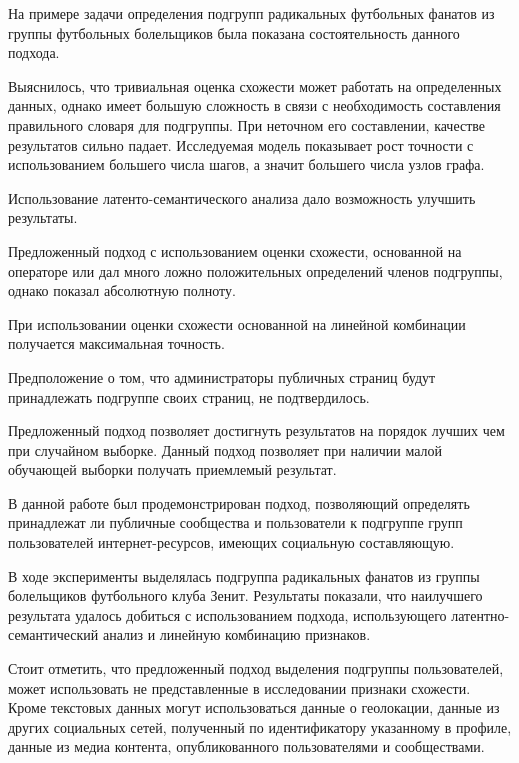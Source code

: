 \documentclass[annotation,times,page4]{itmo-student-thesis}
\begin{document}
На примере задачи определения подгрупп радикальных футбольных фанатов из группы футбольных болельщиков была показана состоятельность данного подхода. 

Выяснилось, что тривиальная оценка схожести может работать на определенных данных, однако имеет большую сложность в связи с необходимость составления правильного словаря для подгруппы. При неточном его составлении, качестве результатов сильно падает. Исследуемая модель показывает рост точности с использованием большего числа шагов, а значит большего числа узлов графа. 

Использование латенто-семантического анализа дало возможность улучшить результаты.

Предложенный подход с использованием оценки схожести, основанной на операторе или дал много ложно положительных определений членов подгруппы, однако показал абсолютную полноту.

При использовании оценки схожести основанной на линейной комбинации получается максимальная точность.

Предположение о том, что администраторы публичных страниц будут принадлежать подгруппе своих страниц, не подтвердилось. 

Предложенный подход позволяет достигнуть результатов на порядок лучших чем при случайном выборке.  
 Данный подход позволяет при наличии малой обучающей выборки получать приемлемый результат.



\startconclusionpage

В данной работе был продемонстрирован подход, позволяющий определять принадлежат ли публичные сообщества и пользователи к подгруппе групп пользователей интернет-ресурсов, имеющих социальную составляющую.

В ходе эксперименты выделялась подгруппа радикальных фанатов из группы болельщиков футбольного клуба Зенит. Результаты показали, что наилучшего результата удалось добиться с использованием подхода, использующего латентно-семантический анализ и линейную комбинацию признаков.

Стоит отметить, что предложенный подход выделения подгруппы пользователей, может использовать не представленные в исследовании признаки схожести. Кроме текстовых данных могут использоваться данные о геолокации, данные из других социальных сетей, полученный по идентификатору указанному в профиле, данные из медиа контента, опубликованного пользователями и сообществами. 
\end{document}
